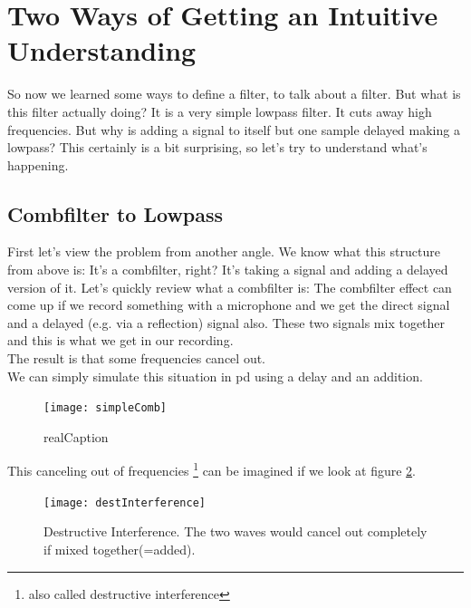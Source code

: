     


\section{Two Ways of Getting an Intuitive Understanding}

So now we learned some ways to define a filter, to talk about a filter. But what is this filter actually doing? It is a very simple lowpass filter. It cuts away high frequencies. But why is adding a signal to itself but one sample delayed making a lowpass? This certainly is a bit surprising, so let's try to understand what's happening.

\subsection{Combfilter to Lowpass}
First let's view the problem from another angle. We know what this structure from above is: It's a combfilter, right? It's taking a signal and adding a delayed version of it. Let's quickly review what a combfilter is:
The combfilter effect can come up if we record something with a microphone and we get the direct signal and a delayed (e.g. via a reflection) signal also. These two signals mix together and this is what we get in our recording.\\
The result is that some frequencies cancel out.\\
We can simply simulate this situation in pd using a delay and an addition. 

\begin{figure}[H]
	\centering
	\texttt{[image: simpleComb]}
	\caption[shortCaption]
	{realCaption}
	\label{fig:label}
\end{figure}

This canceling out of frequencies \footnote{also called destructive interference} can be imagined if we look at figure \ref{fig:destIntereference}. 
\begin{figure}[H]
	\centering
	\texttt{[image: destInterference]}
	\caption[Destructive Interference]
	{Destructive Interference. The two waves would cancel out completely if mixed together(=added).}
	\label{fig:destIntereference}
\end{figure}

